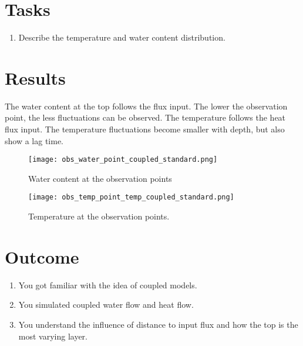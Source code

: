 \documentclass[
10pt, %
a4paper, %
oneside, %
headinclude,footinclude, %
BCOR5mm, %
]{scrartcl}
\begin{document}
\section*{Tasks}

\begin{enumerate}
\item Describe the temperature and water content distribution.
\end{enumerate}



\section*{Results}

The water content at the top follows the flux input. The lower the observation point, the less fluctuations can be observed.
The temperature follows the heat flux input. The temperature fluctuations become smaller with depth, but also show a lag time.

\begin{figure}[!h]
\centering
\texttt{[image: obs\_water\_point\_coupled\_standard.png]}
\caption{Water content at the observation points}
\end{figure}

\begin{figure}[!h]
\centering
\texttt{[image: obs\_temp\_point\_temp\_coupled\_standard.png]}
\caption{Temperature at the observation points.}
\end{figure}

\newpage
\newpage

\section{Outcome}
\begin{enumerate}
\item You got familiar with the idea of coupled models. 
\item You simulated coupled water flow and heat flow.
\item You understand the influence of distance to input flux and how the top is the most varying layer.
\end{enumerate}





%


\end{document}
